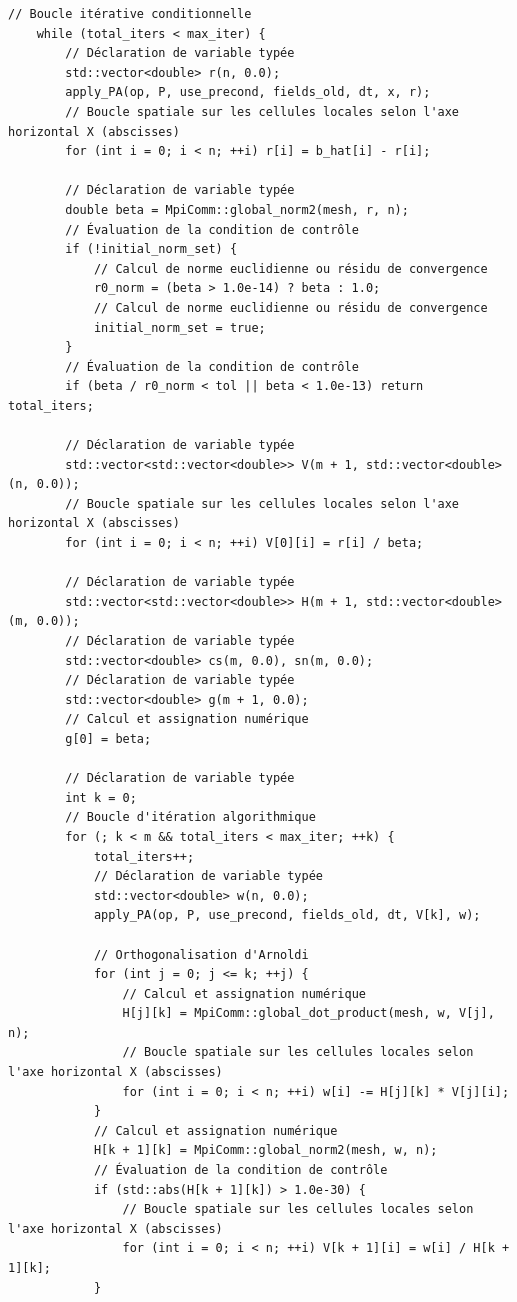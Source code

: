 \documentclass[10pt,a4paper,oneside]{book}
\begin{document}
\begin{lstlisting}[language={[11]C++}]
    // Boucle itérative conditionnelle
    while (total_iters < max_iter) {
        // Déclaration de variable typée
        std::vector<double> r(n, 0.0);
        apply_PA(op, P, use_precond, fields_old, dt, x, r);
        // Boucle spatiale sur les cellules locales selon l'axe horizontal X (abscisses)
        for (int i = 0; i < n; ++i) r[i] = b_hat[i] - r[i];

        // Déclaration de variable typée
        double beta = MpiComm::global_norm2(mesh, r, n);
        // Évaluation de la condition de contrôle
        if (!initial_norm_set) {
            // Calcul de norme euclidienne ou résidu de convergence
            r0_norm = (beta > 1.0e-14) ? beta : 1.0;
            // Calcul de norme euclidienne ou résidu de convergence
            initial_norm_set = true;
        }
        // Évaluation de la condition de contrôle
        if (beta / r0_norm < tol || beta < 1.0e-13) return total_iters;

        // Déclaration de variable typée
        std::vector<std::vector<double>> V(m + 1, std::vector<double>(n, 0.0));
        // Boucle spatiale sur les cellules locales selon l'axe horizontal X (abscisses)
        for (int i = 0; i < n; ++i) V[0][i] = r[i] / beta;

        // Déclaration de variable typée
        std::vector<std::vector<double>> H(m + 1, std::vector<double>(m, 0.0));
        // Déclaration de variable typée
        std::vector<double> cs(m, 0.0), sn(m, 0.0);
        // Déclaration de variable typée
        std::vector<double> g(m + 1, 0.0);
        // Calcul et assignation numérique
        g[0] = beta;

        // Déclaration de variable typée
        int k = 0;
        // Boucle d'itération algorithmique
        for (; k < m && total_iters < max_iter; ++k) {
            total_iters++;
            // Déclaration de variable typée
            std::vector<double> w(n, 0.0);
            apply_PA(op, P, use_precond, fields_old, dt, V[k], w);

            // Orthogonalisation d'Arnoldi
            for (int j = 0; j <= k; ++j) {
                // Calcul et assignation numérique
                H[j][k] = MpiComm::global_dot_product(mesh, w, V[j], n);
                // Boucle spatiale sur les cellules locales selon l'axe horizontal X (abscisses)
                for (int i = 0; i < n; ++i) w[i] -= H[j][k] * V[j][i];
            }
            // Calcul et assignation numérique
            H[k + 1][k] = MpiComm::global_norm2(mesh, w, n);
            // Évaluation de la condition de contrôle
            if (std::abs(H[k + 1][k]) > 1.0e-30) {
                // Boucle spatiale sur les cellules locales selon l'axe horizontal X (abscisses)
                for (int i = 0; i < n; ++i) V[k + 1][i] = w[i] / H[k + 1][k];
            }


\end{lstlisting}
\end{document}
